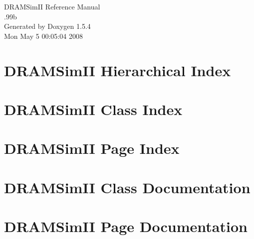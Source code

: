 \documentclass[a4paper]{book}
\begin{document}
\begin{titlepage}
\vspace*{7cm}
\begin{center}
{\Large DRAMSimII Reference Manual\\[1ex]\large .99b }\\
\vspace*{1cm}
{\large Generated by Doxygen 1.5.4}\\
\vspace*{0.5cm}
{\small Mon May 5 00:05:04 2008}\\
\end{center}
\end{titlepage}
\clearemptydoublepage
{}
\tableofcontents
\clearemptydoublepage
{}
\chapter{DRAMSimII Hierarchical Index}

\chapter{DRAMSimII Class Index}

\chapter{DRAMSimII Page Index}

\chapter{DRAMSimII Class Documentation}























\chapter{DRAMSimII Page Documentation}

\printindex
\end{document}
